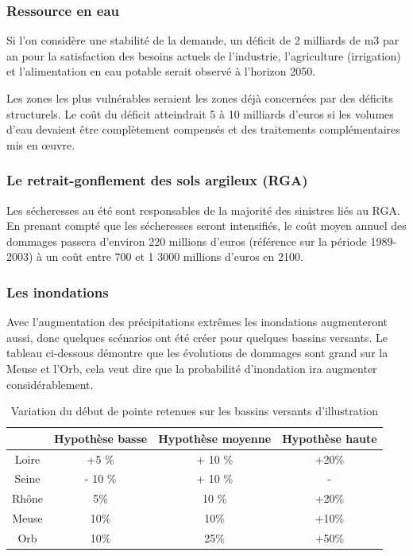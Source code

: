 \documentclass[a4paper,11pt]{article}
\begin{document}
\subsubsection*{Ressource en eau}
Si l’on considère une stabilité de la demande, un déficit de 2 milliards de m3
par an  pour la satisfaction  des besoins actuels de  l’industrie, l’agriculture
(irrigation) et l’alimentation en eau potable serait observé à l’horizon 2050.

Les zones les plus vulnérables seraient les zones déjà concernées par des déficits structurels. Le coût
du déficit atteindrait 5 à 10 milliards d’euros si les volumes d’eau devaient être
complètement compensés et des traitements complémentaires mis en œuvre.

\subsubsection*{Le retrait-gonflement des sols argileux (RGA)}

Les sécheresses au été sont responsables de la majorité des sinistres liés au RGA.
En prenant compté  que les sécheresses seront intensifiés,  le coût moyen annuel
des dommages  passera d’environ 220  millions d’euros (référence sur  la période
1989-2003) à un coût entre 700 et 1 3000 millions d’euros en 2100.

\subsubsection*{Les inondations}
Avec  l'augmentation des  précipitations extrêmes  les  inondations augmenteront
aussi, donc quelques scénarios ont été créer pour quelques bassins versants.
Le tableau ci-dessous démontre que les  évolutions de dommages sont grand sur la
Meuse et  l'Orb, cela veut dire  que la probabilité  d'inondation ira augmenter
considérablement. 


\begin{table}[H]
  \begin{center}
    \caption{Variation du début de pointe retenues sur les bassins versants d’illustration}
    \begin{tabular}{|c|c|c|c|}
      \hline
      & Hypothèse basse &Hypothèse moyenne &Hypothèse haute\\
      \hline
      Loire & +5 \% & + 10 \% & +20\%\\
      Seine & - 10 \% &+ 10 \% & - \\ 
      Rhône & 5\% & 10 \% & +20\%\\
      Meuse & 10\%& 10\%& +10\%\\
      Orb &10\% & 25\% & +50\% \\
      \hline
    \end{tabular}
  \end{center}
\end{table}
\end{document}
